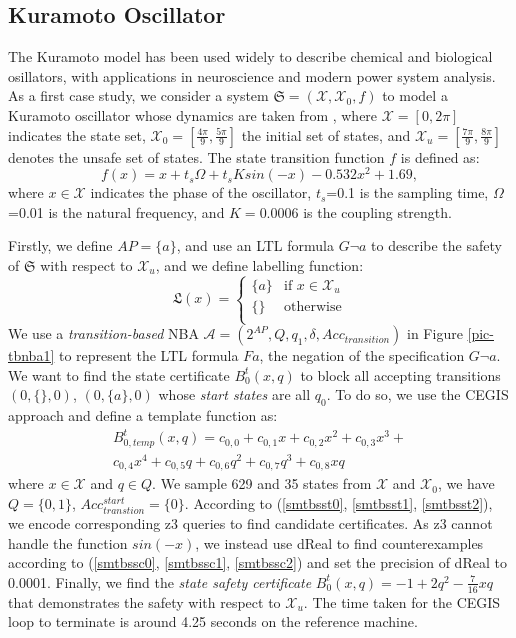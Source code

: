 \documentclass[acmlarge]{acmart}
\begin{document}
\subsection{Kuramoto Oscillator}
The Kuramoto model has been used widely to describe chemical and biological osillators, with applications in neuroscience and modern power system analysis. As a first case study, we consider
a system $\mathfrak{S} = (\mathcal{X}, \mathcal{X}_0,  f)$ to model a Kuramoto oscillator whose
dynamics are taken from \cite{murali2024closure}, where $\mathcal{X} = [ 0, 2\pi ]$ indicates the state
set, $\mathcal{X}_0 = [\frac{4\pi}{9}, \frac{5\pi}{9}]$ the initial set of states, and $\mathcal{X}_u = [\frac{7\pi}{9}, \frac{8\pi}{9}]$ denotes the unsafe set of states. The state transition function $f$ is defined as:
$$f(x)=x + t_s\Omega+t_sKsin(-x)-0.532x^2+1.69,$$
where $x \in \mathcal{X}$ indicates the phase of the oscillator, $t_s$=0.1 is the sampling time, $\Omega$=0.01 is the natural frequency, and $K = 0.0006$ is the coupling strength.

Firstly, we define $AP=\{a\}$, and use an LTL formula $G \lnot a$ to describe the safety of $\mathfrak{S}$ with respect to $\mathcal{X}_u$, and we define labelling function:
\[
\mathfrak{L}(x) =
\begin{cases} 
  \{a\} & \text{if }x \in \mathcal{X}_u \\
  \{\} & \text{otherwise}\\
\end{cases}
\]
We use a \emph{transition-based} NBA $\mathcal{A}=(2^{AP}, Q, q_1, \delta, Acc_{transition})$ in Figure \ref{pic-tbnba1} to represent the LTL formula $F a$, the negation of the specification $G \lnot a$. We want to find the state certificate $B^t_{0}(x, q)$ to block all accepting transitions $(0, \{\}, 0)$, $(0, \{a\}, 0)$ whose \emph{start states} are all $q_0$. To do so, we use the CEGIS approach and define a template function as:
\begin{align*}
  B_{0, temp}^{t}(x, q) = c_{0, 0} + c_{0, 1}x + c_{0, 2}x^2 + c_{0, 3}x^3 + \\
  c_{0, 4}x^4 + c_{0, 5}q + c_{0, 6}q^2 + c_{0, 7}q^3 + c_{0, 8}xq  
\end{align*}
where $x \in \mathcal{X}$ and $q \in Q$. We sample 629 and 35 states from $\mathcal{X}$ and $\mathcal{X}_0$, we have $Q=\{0, 1\}$, $Acc_{transtion}^{start} = \{0\}$. According to (\ref{smtbsst0}, \ref{smtbsst1}, \ref{smtbsst2}), we encode corresponding z3 \cite{de2008z3} queries to find candidate certificates. As z3 cannot handle the function $sin(-x)$, we instead use dReal \cite{gao2013dreal} to find counterexamples according to (\ref{smtbssc0}, \ref{smtbssc1}, \ref{smtbssc2}) and set the precision of dReal to 0.0001. Finally, we find the \emph{state safety certificate} $B_0^t(x, q) = -1 + 2q^2-\frac{7}{16}xq$ that demonstrates the safety with respect to $\mathcal{X}_u$. The time taken for the CEGIS loop to terminate is around 4.25 seconds on the reference machine.
\end{document}
